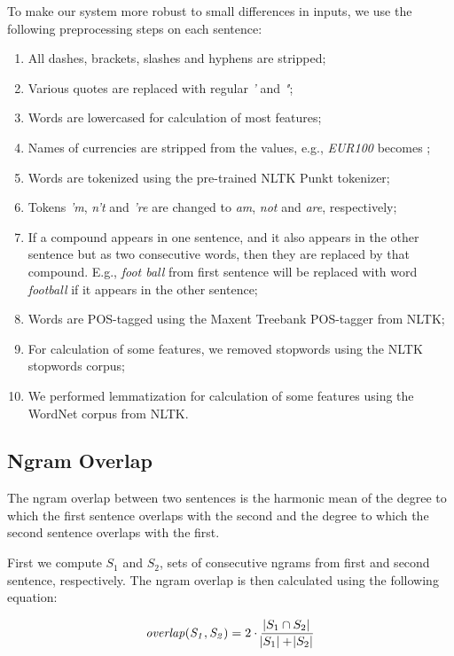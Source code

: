 \documentclass[10pt, a4paper]{article}
\begin{document}
To make our system more robust to small differences in inputs, we use the following preprocessing steps on each sentence:
\begin{enumerate} \itemsep1pt \parskip0pt 
  \item All dashes, brackets, slashes and hyphens are stripped;
  \item Various quotes are replaced with regular \textit{'} and \textit{"};
  \item Words are lowercased for calculation of most features;
  \item Names of currencies are stripped from the values, e.g., \textit{\EUR EUR100} becomes \textit{};
  \item Words are tokenized using the pre-trained NLTK Punkt tokenizer;
  \item Tokens \textit{'m}, \textit{n't} and \textit{'re} are changed to \textit{am}, \textit{not} and \textit{are}, respectively;
  \item If a compound appears in one sentence, and it also appears in the other sentence but as two consecutive words, then they are replaced by that compound. E.g., \textit{foot ball} from first sentence will be replaced with word \textit{football} if it appears in the other sentence;
  \item Words are POS-tagged using the Maxent Treebank POS-tagger from NLTK;
  \item For calculation of some features, we removed stopwords using the NLTK stopwords corpus;
  \item We performed lemmatization for calculation of some features using the WordNet corpus from NLTK.
\end{enumerate}

\subsection{Ngram Overlap} 

The ngram overlap between two sentences is the harmonic mean of the degree to which the first sentence overlaps with the second and the degree to which the second sentence overlaps with the first.

First we compute $S_1$ and $S_2$, sets of consecutive ngrams from first and second sentence, respectively. The ngram overlap is then calculated using the following equation:

\begin{equation}
\mathit{overlap(S_1, S_2)} = 2 \cdot \frac{\abs{S_1 \cap S_2}}{\abs{S_1} + \abs{S_2}}
\end{equation}
\end{document}
